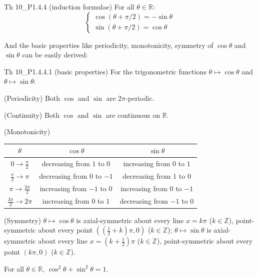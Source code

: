 \documentclass{article}
\begin{document}
\begin{Th}{Th 10\_P1.4.4 (induction formulae)}
    For all $\theta\in \mathbb{R}$: 
    $$
    \begin{cases}
        \cos (\theta + \pi/2) = -\sin \theta \\
        \sin (\theta + \pi/2) = \cos \theta
    \end{cases}
    $$ 
\end{Th}

And the basic properties like periodicity, monotonicity, symmetry of $\cos \theta$ and $\sin \theta$ can be easily derived:

\begin{Th}{Th 10\_P1.4.4.1 (basic properties)}
    For the trigonometric functions $\theta \mapsto \cos \theta$ and $\theta \mapsto \sin \theta$:
    \begin{compactenum}
        \item (Periodicity) Both $\cos$ and $\sin$ are $2\pi$-periodic.
        \item (Continuity) Both $\cos$ and $\sin$ are continuous on $\mathbb{R}$.
        \item (Monotonicity) 
        \begin{table}[H]
            \centering
            \begin{tabular}{|c|c|c|}
            \hline
            $\theta$ & \multicolumn{1}{c|}{$\cos\theta$} & \multicolumn{1}{c|}{$\sin\theta$} \\ \hline
            $0\rightarrow\frac{\pi}{2}$ & decreasing from $1$ to $0$ & increasing from $0$ to $1$ \\ \hline
            $\frac{\pi}{2}\rightarrow\pi$ & decreasing from $0$ to $-1$ & decreasing from $1$ to $0$ \\ \hline
            $\pi\rightarrow\frac{3\pi}{2}$ & increasing from $-1$ to $0$ & increasing from $0$ to $-1$ \\ \hline
            $\frac{3\pi}{2}\rightarrow 2\pi$ & increasing from $0$ to $1$ & decreasing from $-1$ to $0$ \\ \hline
            \end{tabular}
        \end{table}
        \item (Symmetry) $\theta\mapsto \cos \theta$ is axial-symmetric about every line $x = k\pi$ ($k\in \mathbb{Z}$), point-symmetric about every point $\left((\frac{1}{2}+k)\pi, 0\right)$ ($k\in \mathbb{Z}$); $\theta\mapsto \sin \theta$ is axial-symmetric about every line $x = \left(k+\frac{1}{2}\right)\pi$ ($k\in \mathbb{Z}$), point-symmetric about every point $(k\pi, 0)$ ($k\in \mathbb{Z}$).
        \item For all $\theta\in \mathbb{R}$, $\cos^2 \theta + \sin^2 \theta = 1$.
    \end{compactenum}
\end{Th}
\end{document}
